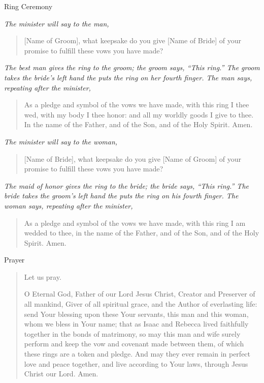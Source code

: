 \documentclass[
]{book}
\begin{document}
Ring Ceremony

\emph{The minister will say to the man,}

\begin{quote}
{[}Name of Groom{]}, what keepsake do you give {[}Name of Bride{]} of your promise to fulfill these vows you have made?
\end{quote}

\emph{The best man gives the ring to the groom; the groom says, ``This ring.'' The groom takes the bride's left hand the puts the ring on her fourth finger. The man says, repeating after the minister,}

\begin{quote}
As a pledge and symbol of the vows we have made, with this ring I thee wed, with my body I thee honor: and all my worldly goods I give to thee. In the name of the Father, and of the Son, and of the Holy Spirit. Amen.
\end{quote}

\emph{The minister will say to the woman,}

\begin{quote}
{[}Name of Bride{]}, what keepsake do you give {[}Name of Groom{]} of your promise to fulfill these vows you have made?
\end{quote}

\emph{The maid of honor gives the ring to the bride; the bride says, ``This ring.'' The bride takes the groom's left hand the puts the ring on his fourth finger. The woman says, repeating after the minister,}

\begin{quote}
As a pledge and symbol of the vows we have made, with this ring I am wedded to thee, in the name of the Father, and of the Son, and of the Holy Spirit. Amen.
\end{quote}

Prayer

\begin{quote}
Let us pray.

O Eternal God, Father of our Lord Jesus Christ, Creator and Preserver of all mankind, Giver of all spiritual grace, and the Author of everlasting life: send Your blessing upon these Your servants, this man and this woman, whom we bless in Your name; that as Isaac and Rebecca lived faithfully together in the bonds of matrimony, so may this man and wife surely perform and keep the vow and covenant made between them, of which these rings are a token and pledge. And may they ever remain in perfect love and peace together, and live according to Your laws, through Jesus Christ our Lord. Amen.
\end{quote}
\end{document}
